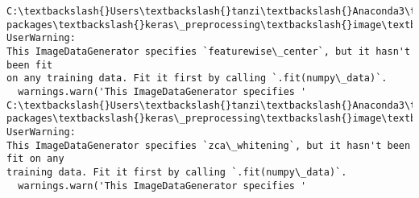 \documentclass[11pt]{article}
\begin{document}
    \begin{Verbatim}[commandchars=\\\{\}]
C:\textbackslash{}Users\textbackslash{}tanzi\textbackslash{}Anaconda3\textbackslash{}lib\textbackslash{}site-
packages\textbackslash{}keras\_preprocessing\textbackslash{}image\textbackslash{}image\_data\_generator.py:716: UserWarning:
This ImageDataGenerator specifies `featurewise\_center`, but it hasn't been fit
on any training data. Fit it first by calling `.fit(numpy\_data)`.
  warnings.warn('This ImageDataGenerator specifies '
C:\textbackslash{}Users\textbackslash{}tanzi\textbackslash{}Anaconda3\textbackslash{}lib\textbackslash{}site-
packages\textbackslash{}keras\_preprocessing\textbackslash{}image\textbackslash{}image\_data\_generator.py:735: UserWarning:
This ImageDataGenerator specifies `zca\_whitening`, but it hasn't been fit on any
training data. Fit it first by calling `.fit(numpy\_data)`.
  warnings.warn('This ImageDataGenerator specifies '
    \end{Verbatim}
\end{document}

